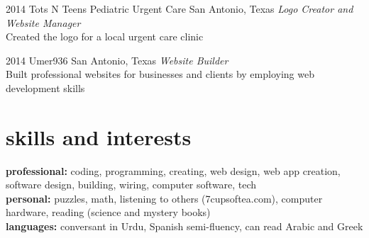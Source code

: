 \documentclass[]{friggeri-cv} %
\begin{document}
\begin{entrylist}
	
	\entry
	{2014}
	{Tots N Teens Pediatric Urgent Care}
	{San Antonio, Texas}
	{\emph{Logo Creator and Website Manager} \\
		Created the logo for a local urgent care clinic}
	
	
	\entry
	{2014}
	{Umer936}
	{San Antonio, Texas}
	{\emph{Website Builder} \\
		Built professional websites for businesses and clients by employing web development skills}
	
	
\end{entrylist}


\section{skills and interests}

\textbf{professional:} coding, programming, creating, web design, web app creation, software design, building, wiring, computer software, tech 
\\ 
\textbf{personal:} puzzles, math, listening to others (7cupsoftea.com), computer hardware, reading (science and mystery books)   \\ 
\textbf{languages:} conversant in Urdu, Spanish semi-fluency, can read Arabic and Greek
\end{document}
